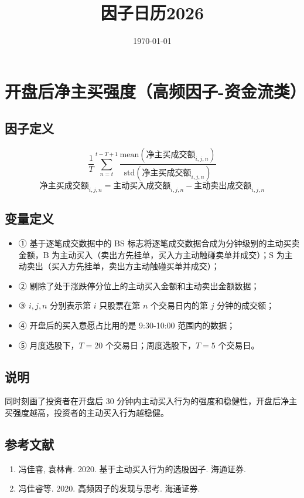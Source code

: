 \documentclass{article}
\title{因子日历2026}
\date{\today}
\begin{document}
\maketitle

\section{开盘后净主买强度（高频因子-资金流类）}

\subsection{因子定义}
\begin{equation}
    \frac{1}{T} \sum_{n=t}^{t-T+1} \frac{\mathrm{mean}(\text{净主买成交额}_{i,j,n})}{\mathrm{std}(\text{净主买成交额}_{i,j,n})}
\end{equation}
\begin{equation}
    \text{净主买成交额}_{i,j,n} = \text{主动买入成交额}_{i,j,n} - \text{主动卖出成交额}_{i,j,n}
\end{equation}
\subsection{变量定义}
\begin{itemize}
    \item ① 基于逐笔成交数据中的 BS 标志将逐笔成交数据合成为分钟级别的主动买卖金额，B 为主动买入（卖出方先挂单，买入方主动触碰卖单并成交）；S 为主动卖出（买入方先挂单，卖出方主动触碰买单并成交）；
    \item ② 剔除了处于涨跌停分位上的主动买入金额和主动卖出金额数据；
    \item ③ \(i, j, n\) 分别表示第 \(i\) 只股票在第 \(n\) 个交易日内的第 \(j\) 分钟的成交额；
    \item ④ 开盘后的买入意愿占比用的是 9:30-10:00 范围内的数据；
    \item ⑤ 月度选股下，\(T=20\) 个交易日；周度选股下，\(T=5\) 个交易日。
\end{itemize}

\subsection{说明}
同时刻画了投资者在开盘后 30 分钟内主动买入行为的强度和稳健性，开盘后净主买强度越高，投资者的主动买入行为越稳健。

\subsection{参考文献}
\begin{enumerate}
    \item 冯佳睿, 袁林青. 2020. 基于主动买入行为的选股因子. 海通证券.
    \item 冯佳睿等. 2020. 高频因子的发现与思考. 海通证券.
\end{enumerate}
\end{document}
